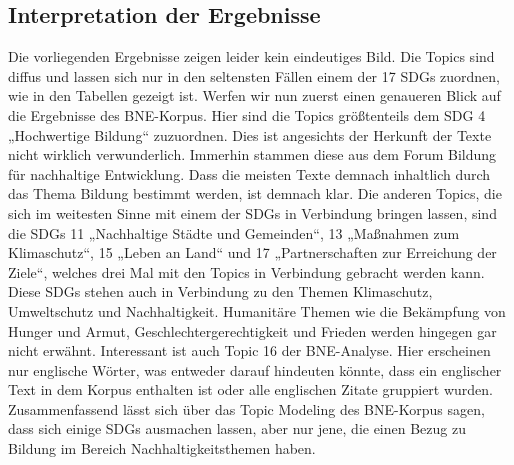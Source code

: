 \documentclass[a4paper,11pt]{article}
\begin{document}
\subsection{Interpretation der Ergebnisse}
Die vorliegenden Ergebnisse zeigen leider kein eindeutiges Bild. Die Topics
sind diffus und lassen sich nur in den seltensten Fällen einem der 17 SDGs
zuordnen, wie in den Tabellen gezeigt ist. Werfen wir nun zuerst einen
genaueren Blick auf die Ergebnisse des BNE-Korpus. Hier sind die Topics
größtenteils dem SDG 4 „Hochwertige Bildung“ zuzuordnen. Dies ist angesichts
der Herkunft der Texte nicht wirklich verwunderlich. Immerhin stammen diese
aus dem Forum Bildung für nachhaltige Entwicklung. Dass die meisten Texte
demnach inhaltlich durch das Thema Bildung bestimmt werden, ist demnach klar.
Die anderen Topics, die sich im weitesten Sinne mit einem der SDGs in
Verbindung bringen lassen, sind die SDGs 11 „Nachhaltige Städte und
Gemeinden“, 13 „Maßnahmen zum Klimaschutz“, 15 „Leben an Land“ und 17
„Partnerschaften zur Erreichung der Ziele“, welches drei Mal mit den Topics in
Verbindung gebracht werden kann. Diese SDGs stehen auch in Verbindung zu den
Themen Klimaschutz, Umweltschutz und Nachhaltigkeit.  Humanitäre Themen wie
die Bekämpfung von Hunger und Armut, Geschlechtergerechtigkeit und Frieden
werden hingegen gar nicht erwähnt. Interessant ist auch Topic 16 der
BNE-Analyse. Hier erscheinen nur englische Wörter, was entweder darauf
hindeuten könnte, dass ein englischer Text in dem Korpus enthalten ist oder
alle englischen Zitate gruppiert wurden. Zusammenfassend lässt sich über das
Topic Modeling des BNE-Korpus sagen, dass sich einige SDGs ausmachen lassen,
aber nur jene, die einen Bezug zu Bildung im Bereich Nachhaltigkeitsthemen
haben.
\end{document}

